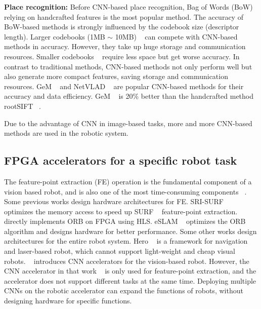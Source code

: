 \textbf{Place recognition:} Before CNN-based place recognition, Bag of Words (BoW)  ~\cite{small_1} relying on handcrafted features is the most popular method. The accuracy of BoW-based methods is strongly influenced by the codebook size (descriptor length). Larger codebooks (1MB $\sim$ 10MB)  ~\cite{large_1, large_2} can compete with CNN-based methods in accuracy. However, they take up huge storage and communication resources. Smaller codebooks ~\cite{small_1, small_2, jegou2014triang} require less space but get worse accuracy. In contrast to traditional methods, CNN-based methods not only perform well but also generate more compact features, saving storage and communication resources. GeM  ~\cite{radenovic2018fine} and NetVLAD  ~\cite{arandjelovic2016netvlad} are popular CNN-based methods for their accuracy and data efficiency. GeM  ~\cite{radenovic2018fine} is 20\% better than the handcrafted method rootSIFT  ~\cite{jegou2014triang}.

Due to the advantage of CNN in image-based tasks, more and more CNN-based methods are used in the robotic system.


\subsection{ FPGA accelerators for a specific robot task }

The feature-point extraction (FE) operation is the fundamental component of a vision based robot, and is also one of the most time-consuming components  ~\cite{fang2017fpga}.
Some previous works design hardware architectures for FE.
SRI-SURF  ~\cite{jia2016sri} optimizes the memory access to speed up SURF  ~\cite{bay2006surf} feature-point extraction. 
~\cite{fang2017fpga} directly implements ORB on FPGA using HLS. eSLAM ~\cite{liu2019eslam} optimizes the ORB algorithm and designs hardware for better performance.
Some other works design architectures for the entire robot system. Hero  ~\cite{shi2018hero} is a framework for navigation and laser-based robot, which cannot support light-weight and cheap visual robots. 
~\cite{li2019879gops} introduces CNN accelerators for the vision-based robot. 
However, the CNN accelerator in that work ~\cite{li2019879gops} is only used for feature-point extraction, and the accelerator does not support different tasks at the same time. 
Deploying multiple CNNs on the robotic accelerator can expand the functions of robots, without designing hardware for specific functions.



